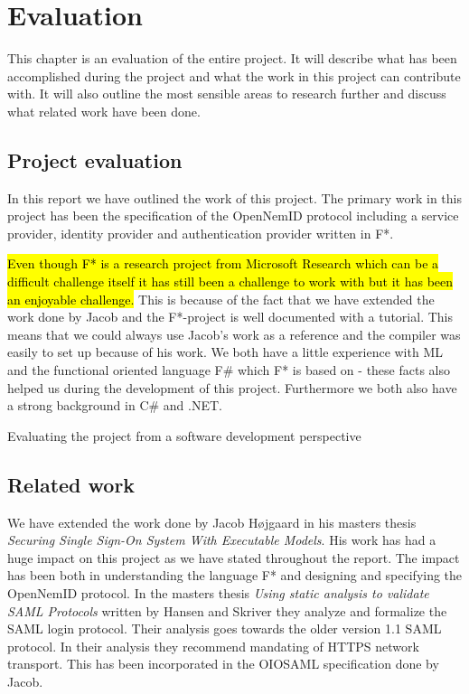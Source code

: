 \documentclass[twosided]{report}
\begin{document}
\chapter{Evaluation}
This chapter is an evaluation of the entire project. It will describe what has been accomplished during the project and what the work in this project can contribute with. It will also outline the most sensible areas to research further and discuss what related work have been done.
\section{Project evaluation}
In this report we have outlined the work of this project. The primary work in this project has been the specification of the OpenNemID protocol including a service provider, identity provider and authentication provider written in F*.
\par
\hl{Even though F* is a research project from Microsoft Research which can be a difficult challenge itself it has still been a challenge to work with but it has been an enjoyable challenge.} This is because of the fact that we have extended the work done by Jacob and the F*-project is well documented with a tutorial. This means that we could always use Jacob's work as a reference and the compiler was easily to set up because of his work. We both have a little experience with ML and the functional oriented language F\# which F* is based on - these facts also helped us during the development of this project. Furthermore we both also have a strong background in C\# and .NET.
\par
Evaluating the project from a software development perspective

\section{Related work}
We have extended the work done by Jacob H{\o}jgaard \cite{jacob} in his masters thesis \emph{Securing Single Sign-On System With Executable Models}. His work has had a huge impact on this project as we have stated throughout the report. The impact has been both in understanding the language F* and designing and specifying the OpenNemID protocol. In the masters thesis \emph{Using static analysis to validate SAML Protocols} written by Hansen and Skriver \cite{HansenSkriver} they analyze and formalize the SAML login protocol. Their analysis goes towards the older version 1.1 SAML protocol. In their analysis they recommend mandating of HTTPS network transport. This has been incorporated in the OIOSAML specification done by Jacob.
\end{document}
